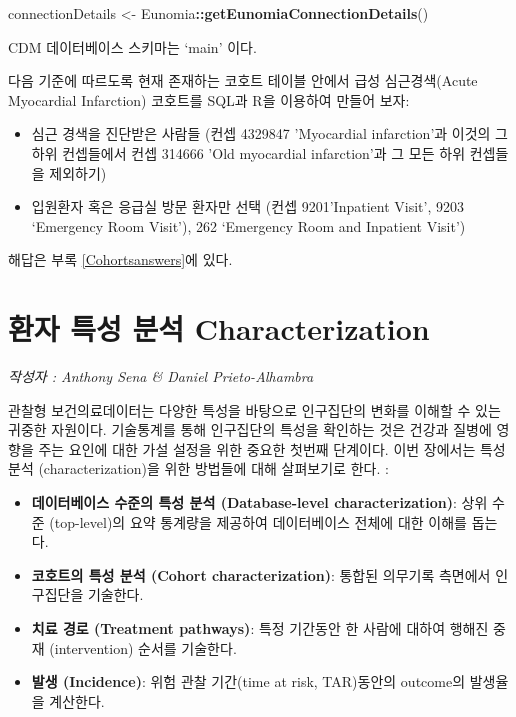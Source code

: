 \documentclass[11pt]{book}
\newenvironment{Shaded}{\begin{snugshade}}{\end{snugshade}}
\newcommand{\KeywordTok}[1]{\textcolor[rgb]{0.13,0.29,0.53}{\textbf{#1}}}
\newcommand{\StringTok}[1]{\textcolor[rgb]{0.31,0.60,0.02}{#1}}
\newcommand{\OperatorTok}[1]{\textcolor[rgb]{0.81,0.36,0.00}{\textbf{#1}}}
\newcommand{\NormalTok}[1]{#1}
\providecommand{\tightlist}{%
  \setlength{\itemsep}{0pt}\setlength{\parskip}{0pt}}
\theoremstyle{definition}
\theoremstyle{definition}
\theoremstyle{definition}
\theoremstyle{remark}
\let\BeginKnitrBlock\begin \let\EndKnitrBlock\end
\begin{document}
\begin{Shaded}
\begin{Highlighting}[]
\NormalTok{connectionDetails <-}\StringTok{ }\NormalTok{Eunomia}\OperatorTok{::}\KeywordTok{getEunomiaConnectionDetails}\NormalTok{()}
\end{Highlighting}
\end{Shaded}

CDM 데이터베이스 스키마는 `main' 이다.

\BeginKnitrBlock{exercise}
\protect\hypertarget{exr:exerciseCohortsSql}{}{\label{exr:exerciseCohortsSql}
}다음 기준에 따르도록 현재 존재하는 코호트 테이블 안에서 급성
심근경색(Acute Myocardial Infarction) 코호트를 SQL과 R을 이용하여 만들어
보자:

\begin{itemize}
\tightlist
\item
  심근 경색을 진단받은 사람들 (컨셉 4329847 'Myocardial infarction'과
  이것의 그 하위 컨셉들에서 컨셉 314666 'Old myocardial infarction'과 그
  모든 하위 컨셉들을 제외하기)
\item
  입원환자 혹은 응급실 방문 환자만 선택 (컨셉 9201'Inpatient Visit',
  9203 `Emergency Room Visit'), 262 `Emergency Room and Inpatient
  Visit')
\end{itemize}
\EndKnitrBlock{exercise}

해답은 부록 \ref{Cohortsanswers}에 있다.

\chapter{환자 특성 분석 Characterization}\label{Characterization}

\emph{작성자 : Anthony Sena \& Daniel Prieto-Alhambra}

관찰형 보건의료데이터는 다양한 특성을 바탕으로 인구집단의 변화를 이해할
수 있는 귀중한 자원이다. 기술통계를 통해 인구집단의 특성을 확인하는 것은
건강과 질병에 영향을 주는 요인에 대한 가설 설정을 위한 중요한 첫번째
단계이다. 이번 장에서는 특성 분석 (characterization)을 위한 방법들에
대해 살펴보기로 한다. :

\begin{itemize}
\tightlist
\item
  \textbf{데이터베이스 수준의 특성 분석 (Database-level
  characterization)}: 상위 수준 (top-level)의 요약 통계량을 제공하여
  데이터베이스 전체에 대한 이해를 돕는다.
\item
  \textbf{코호트의 특성 분석 (Cohort characterization)}: 통합된 의무기록
  측면에서 인구집단을 기술한다.
\item
  \textbf{치료 경로 (Treatment pathways)}: 특정 기간동안 한 사람에
  대하여 행해진 중재 (intervention) 순서를 기술한다.
\item
  \textbf{발생 (Incidence)}: 위험 관찰 기간(time at risk, TAR)동안의
  outcome의 발생율을 계산한다.
\end{itemize}
\end{document}
